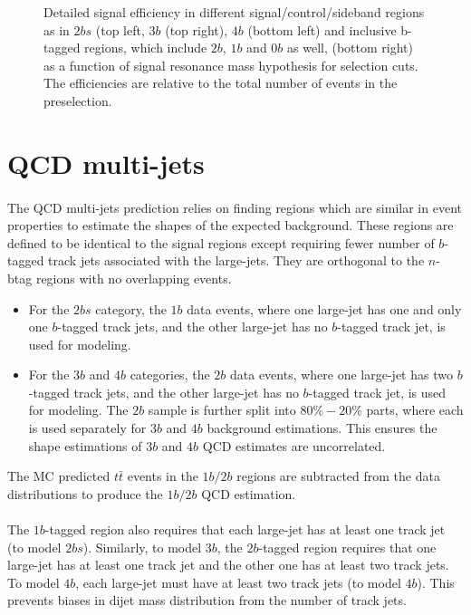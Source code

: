 \begin{figure}
\begin{center}
  \caption{Detailed signal efficiency in different signal/control/sideband regions as in $2bs$ (top left, $3b$ (top right), $4b$ (bottom left) and inclusive b-tagged regions, which include $2b$, $1b$ and 0$b$ as well, (bottom right) as a function of signal resonance mass hypothesis for selection cuts. The efficiencies are relative to the total number of events in the preselection.}
  \label{fig:boosted-selection-region-efficiency}
\end{center}
\end{figure}


\section{QCD multi-jets}
\label{sec:boosted-qcd}

\paragraph{}
The QCD multi-jets prediction relies on finding regions which are similar in event properties to estimate the shapes of the expected background.
These regions are defined to be identical to the signal regions except requiring fewer number of $b$-tagged track jets associated with the large-\R jets.
They are orthogonal to the $n$-btag regions with no overlapping events.
\begin{itemize}
\item For the $2bs$ category, the $1b$ data events, where one large-\R jet has one and only one $b$-tagged track jets, and the other large-\R jet has no $b$-tagged track jet, is used for modeling.
\item For the $3b$ and $4b$ categories, the $2b$ data events, where one large-\R jet has two $b$-tagged track jets, and the other large-\R jet has no $b$-tagged track jet, is used for modeling. The $2b$ sample is further split into $80\%-20\%$ parts, where each is used separately for $3b$ and $4b$ background estimations. This ensures the shape estimations of $3b$ and $4b$ QCD estimates are uncorrelated. 
\end{itemize}
The MC predicted $t\bar{t}$ events in the $1b/2b$ regions are subtracted from the data distributions to produce the $1b/2b$ QCD estimation.

\paragraph{}
The $1b$-tagged region also requires that each large-\R jet has at least one track jet (to model $2bs$).
Similarly, to model $3b$, the $2b$-tagged region requires that one large-\R jet has at least one track jet and the other one has at least two track jets. 
To model $4b$, each large-\R jet must have at least two track jets (to model $4b$).
This prevents biases in dijet mass distribution from the number of track jets.

